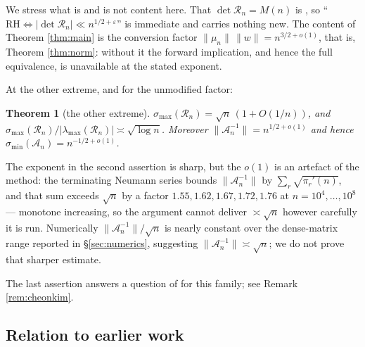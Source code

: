 \documentclass[11pt]{article}
\newtheorem{theorem}{Theorem}
\theoremstyle{definition}
\theoremstyle{remark}
\newcommand{\Rc}{\mathcal{R}}
\newcommand{\Ac}{\mathcal{A}}
\begin{document}
We stress what is and is not
content here. That $\det\Rc_n=M(n)$ is \cite{kline581,kline584}, so
``$\mathrm{RH}\iff|\det\Rc_n|\ll n^{1/2+\varepsilon}$'' is immediate and carries
nothing new. The content of Theorem \ref{thm:main} is the conversion factor
$\|\mu_n\|\,\|w\| = n^{3/2+o(1)}$, that is, Theorem \ref{thm:norm}: without it the
forward implication, and hence the full equivalence, is unavailable at the
stated exponent.

At the other extreme, and for the unmodified factor:

\begin{theorem}[the other extreme]\label{thm:max}
$\sigma_{\max}(\Rc_n)=\sqrt n\,(1+O(1/n))$, and
$\sigma_{\max}(\Rc_n)/|\lambda_{\max}(\Rc_n)|\asymp\sqrt{\log n}$.
Moreover $\|\Ac_n^{-1}\|=n^{1/2+o(1)}$ and hence
$\sigma_{\min}(\Ac_n)=n^{-1/2+o(1)}$.
\end{theorem}

The exponent in the second assertion is sharp, but the $o(1)$ is an artefact of
the method: the terminating Neumann series bounds $\|\Ac_n^{-1}\|$ by
$\sum_r\sqrt{\pi_r'(n)}$, and that sum exceeds $\sqrt n$ by a factor
$1.55,1.62,1.67,1.72,1.76$ at $n=10^4,\dots,10^8$ --- monotone increasing, so the
argument cannot deliver $\asymp\sqrt n$ however carefully it is run. Numerically
$\|\Ac_n^{-1}\|/\sqrt n$ is nearly constant over the dense-matrix range reported
in \S\ref{sec:numerics}, suggesting $\|\Ac_n^{-1}\|\asymp\sqrt n$; we do not
prove that sharper estimate.

The last assertion answers a question of \cite{cheonkim} for this family; see
Remark \ref{rem:cheonkim}.

\subsection{Relation to earlier work}
\end{document}
